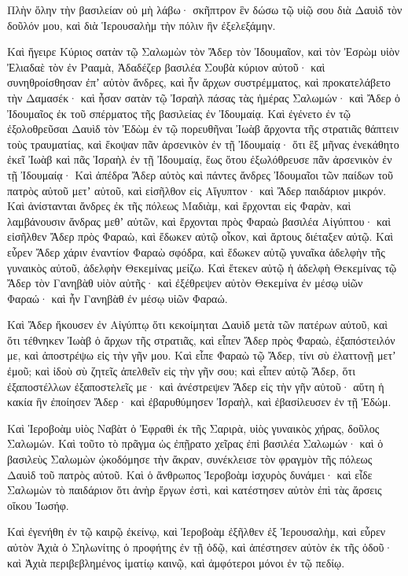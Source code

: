 {Πλὴν ὅλην τὴν βασιλείαν οὐ μὴ λάβω· σκῆπτρον ἓν δώσω τῷ υἱῷ σου διὰ Δαυὶδ τὸν δοῦλόν μου, καὶ διὰ Ἱερουσαλὴμ τὴν πόλιν ἣν ἐξελεξάμην.
\par }{\PP {}Καὶ ἤγειρε Κύριος σατὰν τῷ Σαλωμὼν τὸν Ἄδερ τὸν Ἰδουμαῖον, καὶ τὸν Ἐσρὼμ υἱὸν Ἐλιαδαὲ τὸν ἐν Ρααμὰ, Ἀδαδέζερ βασιλέα Σουβὰ κύριον αὐτοῦ· καὶ συνηθροίσθησαν ἐπʼ αὐτὸν ἄνδρες, καὶ ἦν ἄρχων συστρέμματος, καὶ προκατελάβετο τὴν Δαμασέκ· καὶ ἦσαν σατὰν τῷ Ἰσραὴλ πάσας τὰς ἡμέρας Σαλωμών· καὶ Ἄδερ ὁ Ἰδουμαῖος ἐκ τοῦ σπέρματος τῆς βασιλείας ἐν Ἰδουμαίᾳ.
Καὶ ἐγένετο ἐν τῷ ἐξολοθρεῦσαι Δαυὶδ τὸν Ἐδὼμ ἐν τῷ πορευθῆναι Ἰωὰβ ἄρχοντα τῆς στρατιᾶς θάπτειν τοὺς τραυματίας, καὶ ἔκοψαν πᾶν ἀρσενικὸν ἐν τῇ Ἰδουμαίᾳ·
ὅτι ἓξ μῆνας ἐνεκάθητο ἐκεῖ Ἰωὰβ καὶ πᾶς Ἰσραὴλ ἐν τῇ Ἰδουμαίᾳ, ἕως ὅτου ἐξωλόθρευσε πᾶν ἀρσενικὸν ἐν τῇ Ἰδουμαίᾳ·
Καὶ ἀπέδρα Ἄδερ αὐτὸς καὶ πάντες ἄνδρες Ἰδουμαῖοι τῶν παίδων τοῦ πατρὸς αὐτοῦ μετʼ αὐτοῦ, καὶ εἰσῆλθον εἰς Αἴγυπτον· καὶ Ἄδερ παιδάριον μικρόν.
Καὶ ἀνίστανται ἄνδρες ἐκ τῆς πόλεως Μαδιὰμ, καὶ ἔρχονται εἰς Φαρὰν, καὶ λαμβάνουσιν ἄνδρας μεθʼ αὑτῶν, καὶ ἔρχονται πρὸς Φαραὼ βασιλέα Αἰγύπτου· καὶ εἰσῆλθεν Ἄδερ πρὸς Φαραὼ, καὶ ἔδωκεν αὐτῷ οἶκον, καὶ ἄρτους διέταξεν αὐτῷ.
Καὶ εὗρεν Ἄδερ χάριν ἐναντίον Φαραὼ σφόδρα, καὶ ἔδωκεν αὐτῷ γυναῖκα ἀδελφὴν τῆς γυναικὸς αὐτοῦ, ἀδελφὴν Θεκεμίνας μείζω. Καὶ ἔτεκεν αὐτῷ ἡ ἀδελφὴ Θεκεμίνας τῷ Ἄδερ τὸν Γανηβὰθ υἱὸν αὐτῆς·
καὶ ἐξέθρεψεν αὐτὸν Θεκεμίνα ἐν μέσῳ υἱῶν Φαραώ· καὶ ἦν Γανηβὰθ ἐν μέσῳ υἱῶν Φαραώ.
\par }{\PP {}Καὶ Ἄδερ ἤκουσεν ἐν Αἰγύπτῳ ὅτι κεκοίμηται Δαυὶδ μετὰ τῶν πατέρων αὐτοῦ, καὶ ὅτι τέθνηκεν Ἰωὰβ ὁ ἄρχων τῆς στρατιᾶς, καὶ εἶπεν Ἄδερ πρὸς Φαραὼ, ἐξαπόστειλόν με, καὶ ἀποστρέψω εἰς τὴν γῆν μου.
Καὶ εἶπε Φαραὼ τῷ Ἄδερ, τίνι σὺ ἐλαττονῇ μετʼ ἐμοῦ; καὶ ἰδοὺ σὺ ζητεῖς ἀπελθεῖν εἰς τὴν γῆν σου; καὶ εἶπεν αὐτῷ Ἄδερ, ὅτι ἐξαποστέλλων ἐξαποστελεῖς με· καὶ ἀνέστρεψεν Ἄδερ εἰς τὴν γῆν αὐτοῦ·
αὕτη ἡ κακία ἣν ἐποίησεν Ἄδερ· καὶ ἐβαρυθύμησεν Ἰσραὴλ, καὶ ἐβασίλευσεν ἐν τῇ Ἐδώμ.
\par }{\PP {}Καὶ Ἱεροβοὰμ υἱὸς Ναβὰτ ὁ Ἐφραθὶ ἐκ τῆς Σαριρὰ, υἱὸς γυναικὸς χήρας, δοῦλος Σαλωμών.
Καὶ τοῦτο τὸ πρᾶγμα ὡς ἐπῇρατο χεῖρας ἐπὶ βασιλέα Σαλωμών· καὶ ὁ βασιλεὺς Σαλωμὼν ᾠκοδόμησε τὴν ἄκραν, συνέκλεισε τὸν φραγμὸν τῆς πόλεως Δαυὶδ τοῦ πατρὸς αὐτοῦ.
Καὶ ὁ ἄνθρωπος Ἱεροβοὰμ ἰσχυρὸς δυνάμει· καὶ εἶδε Σαλωμὼν τὸ παιδάριον ὅτι ἀνὴρ ἔργων ἐστὶ, καὶ κατέστησεν αὐτὸν ἐπὶ τὰς ἄρσεις οἴκου Ἰωσήφ.
\par }{\PP {}Καὶ ἐγενήθη ἐν τῷ καιρῷ ἐκείνῳ, καὶ Ἱεροβοὰμ ἐξῆλθεν ἐξ Ἱερουσαλὴμ, καὶ εὗρεν αὐτὸν Ἀχιὰ ὁ Σηλωνίτης ὁ προφήτης ἐν τῇ ὁδῷ, καὶ ἀπέστησεν αὐτὸν ἐκ τῆς ὁδοῦ· καὶ Ἀχιὰ περιβεβλημένος ἱματίῳ καινῷ, καὶ ἀμφότεροι μόνοι ἐν τῷ πεδίῳ.
}
